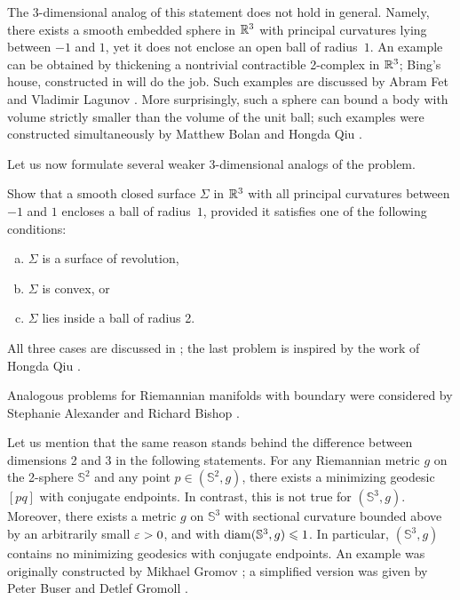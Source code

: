 The 3-dimensional analog of this statement does not hold in general.
Namely, there exists a smooth embedded sphere in $\mathbb{R}^3$ with principal curvatures lying between $-1$ and $1$, yet it does not enclose an open ball of radius~$1$.
An example can be obtained by thickening a nontrivial contractible 2-complex in $\mathbb{R}^3$;
Bing's house, constructed in \cite{bing} will do the job.
Such examples are discussed by Abram Fet and Vladimir Lagunov \cite{lagunov-2,lagunov-fet-1,lagunov-fet-2}.
More surprisingly, such a sphere can bound a body with volume strictly smaller than the volume of the unit ball; such examples were constructed simultaneously by Matthew Bolan \cite{bolan2025} and Hongda Qiu \cite{qiu2025}.

Let us now formulate several weaker 3-dimensional analogs of the problem.

\begin{pr}
Show that a smooth closed surface $\Sigma$ in $\mathbb{R}^3$ with all principal curvatures between $-1$ and $1$ encloses a ball of radius~$1$, provided it satisfies one of the following conditions:
\begin{enumerate}[(a)]
 \item $\Sigma$ is a surface of revolution,
 \item $\Sigma$ is convex, or
 \item $\Sigma$ lies inside a ball of radius 2.
\end{enumerate}
\end{pr}

All three cases are discussed in \cite{petrunin-zamora}; the last problem is inspired by the work of Hongda Qiu \cite{qiu2026}.

Analogous problems for Riemannian manifolds with boundary were considered by Stephanie Alexander and Richard Bishop \cite{alexander-bishop}.

Let us mention that the same reason stands behind the difference between dimensions 2 and 3 in the following statements.
For any Riemannian metric $g$ on the 2-sphere $\mathbb{S}^2$
and any point $p \in (\mathbb{S}^2, g)$, there exists a minimizing geodesic $[pq]$ with conjugate endpoints.
In contrast, this is not true for $(\mathbb{S}^3, g)$.
Moreover, there exists a metric $g$ on $\mathbb{S}^3$
with sectional curvature bounded above by an arbitrarily small $\varepsilon > 0$, and with $\operatorname{\rm diam}\nolimits(\mathbb{S}^3, g) \leqslant 1$.
In particular, $(\mathbb{S}^3, g)$ contains no minimizing geodesics with conjugate endpoints.
An example was originally constructed by Mikhael Gromov \cite{gromov-almost-flat};
a simplified version was given by Peter Buser and Detlef Gromoll \cite{buser-gromoll}.

